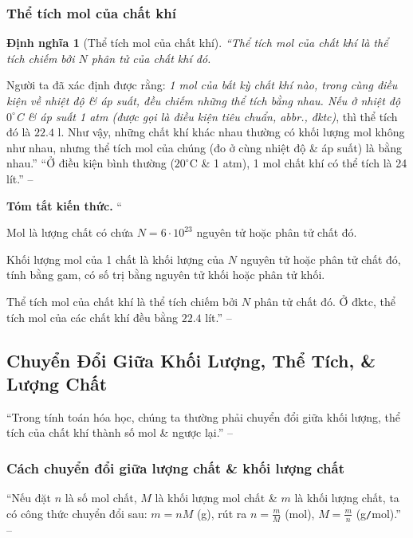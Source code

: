 \documentclass{article}
\numberwithin{equation}{section}
\newtheorem{dinhnghia}{Định nghĩa}[section]
\begin{document}
\subsubsection{Thể tích mol của chất khí}

\begin{dinhnghia}[Thể tích mol của chất khí]
	``\emph{Thể tích mol của chất khí} là thể tích chiếm bởi $N$ phân tử của chất khí đó.
\end{dinhnghia}
Người ta đã xác định được rằng: \textit{1 mol của bất kỳ chất khí nào, trong cùng điều kiện về nhiệt độ \& áp suất, đều chiếm những thể tích bằng nhau. Nếu ở nhiệt độ $0^\circ$C \& áp suất 1 atm (được gọi là \emph{điều kiện tiêu chuẩn}, abbr., \emph{đktc})}, thì thể tích đó là $22.4$ l. Như vậy, những chất khí khác nhau thường có khối lượng mol không như nhau, nhưng thể tích mol của chúng (đo ở cùng nhiệt độ \& áp suất) là bằng nhau.'' ``Ở điều kiện bình thường ($20^\circ$C \& 1 atm), 1 mol chất khí có thể tích là 24 lít.'' -- \cite[pp. 63--64]{SGK_Hoa_Hoc_8}
\vspace{2mm}

\noindent\textbf{Tóm tắt kiến thức.}
``\begin{enumerate*}
	\item[\textbf{1.}] Mol là lượng chất có chứa $N = 6\cdot 10^{23}$ nguyên tử hoặc phân tử chất đó.
	\item[\textbf{2.}] Khối lượng mol của 1 chất là khối lượng của $N$ nguyên tử hoặc phân tử chất đó, tính bằng gam, có số trị bằng nguyên tử khối hoặc phân tử khối.
	\item[\textbf{3.}] Thể tích mol của chất khí là thể tích chiếm bởi $N$ phân tử chất đó. Ở đktc, thể tích mol của các chất khí đều bằng $22.4$ lít.'' -- \cite[p. 64]{SGK_Hoa_Hoc_8}
\end{enumerate*}


\subsection{Chuyển Đổi Giữa Khối Lượng, Thể Tích, \& Lượng Chất}
``Trong tính toán hóa học, chúng ta thường phải chuyển đổi giữa khối lượng, thể tích của chất khí thành số mol \& ngược lại.'' -- \cite[p. 66]{SGK_Hoa_Hoc_8}

\subsubsection{Cách chuyển đổi giữa lượng chất \& khối lượng chất}
``Nếu đặt $n$ là số mol chất, $M$ là khối lượng mol chất \& $m$ là khối lượng chất, ta có công thức chuyển đổi sau: $m = nM$ (g), rút ra $n = \frac{m}{M}$ (mol), $M = \frac{m}{n}$ (g\texttt{/}mol).'' -- \cite[p. 66]{SGK_Hoa_Hoc_8}
\end{document}
